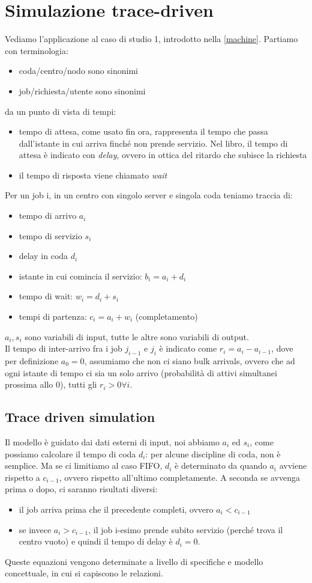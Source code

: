 \documentclass{article}
\begin{document}
\section{Simulazione trace-driven}
Vediamo l'applicazione al caso di studio 1, introdotto nella \ref{machine}. Partiamo con terminologia:
\begin{itemize}
\item coda/centro/nodo sono sinonimi
\item job/richiesta/utente sono sinonimi
\end{itemize}
da un punto di vista di tempi:
\begin{itemize}
\item tempo di attesa, come usato fin ora, rappresenta il tempo che passa dall'istante in cui arriva finché non prende servizio. Nel libro, il tempo di attesa è indicato con \textit{delay}, ovvero in ottica del ritardo che subisce la richiesta
\item il tempo di risposta viene chiamato \textit{wait}
\end{itemize}
Per un job i, in un centro con singolo server e singola coda teniamo traccia di:
\begin{itemize}
\item tempo di arrivo $a_i$
\item tempo di servizio $s_i$
\item delay in coda $d_i$
\item istante in cui comincia il servizio: $b_i = a_i + d_i$
\item tempo di wait: $w_i = d_i + s_i$
\item tempi di partenza: $c_i = a_i + w_i$ (completamento)
\end{itemize}
$a_i, s_i$ sono variabili di input, tutte le altre sono variabili di output.\\ Il tempo di inter-arrivo fra i job $j_{i-1}$ e $j_i$ è indicato come $r_i = a_i - a_{i-1}$, dove per definizione $a_0 = 0$, assumiamo che non ci siano bulk arrivals, ovvero che ad ogni istante di tempo ci sia un solo arrivo (probabilità di attivi simultanei prossima allo 0), tutti gli $r_i > 0 \forall i$.
\subsection{Trace driven simulation}
Il modello è guidato dai dati esterni di input, noi abbiamo $a_i$ ed $s_i$, come possiamo calcolare il tempo di coda $d_i$: per alcune discipline di coda, non è semplice. Ma se ci limitiamo al caso FIFO, $d_i$ è determinato da quando $a_i$ avviene rispetto a $c_{i-1}$, ovvero rispetto all'ultimo completamente. A seconda se avvenga prima o dopo, ci saranno risultati diversi:
\begin{itemize}
\item il job arriva prima che il precedente completi, ovvero $a_i < c_{i-1}$
\item se invece $a_i > c_{i-1}$, il job i-esimo prende subito servizio (perché trova il centro vuoto) e quindi il tempo di delay è $d_i = 0$.
\end{itemize}
Queste equazioni vengono determinate a livello di specifiche e modello concettuale, in cui si capiscono le relazioni.
\end{document}
